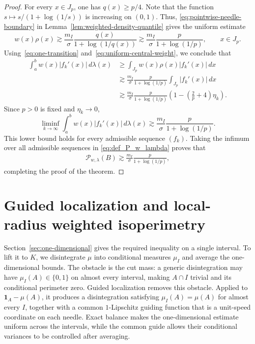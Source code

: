 \documentclass[11pt]{article}
\theoremstyle{definition}
\theoremstyle{remark}
\newcommand{\one}{\mathbf 1}
\begin{document}
\begin{proof}
For every $x\in J_p$, one has $q(x)\ge p/4$. Note that the function
$s\mapsto s/(1+\log(1/s))$ is increasing on $(0,1)$. Thus, \eqref{eq:pointwise-needle-boundary} in Lemma~\ref{lem:weighted-density-quantile} gives the uniform estimate
\begin{equation}\label{eq:uniform-central-weight}
 w(x)\rho(x)\gtrsim
 \frac{m_I}{\sigma}
 \frac{q(x)}{1+\log(1/q(x))}
 \gtrsim
 \frac{m_I}{\sigma}
 \frac{p}{1+\log(1/p)},
 \qquad x\in J_p.
\end{equation}
Using~\eqref{eq:one-transition} and~\eqref{eq:uniform-central-weight}, we conclude that
\begin{align*}
 \int_a^b w(x)|f_k'(x)|\,d\lambda(x)
 &\ge
 \int_{J_p}w(x)\rho(x)|f_k'(x)|\,dx\\
 &\gtrsim
 \frac{m_I}{\sigma}
 \frac{p}{1+\log(1/p)}
 \int_{J_p}|f_k'(x)|\,dx\\
 &\gtrsim
 \frac{m_I}{\sigma}
 \frac{p}{1+\log(1/p)}
 \left(1-\left(\frac2p+4\right)\eta_k\right).
\end{align*}
 Since $p>0$ is fixed and
$\eta_k\to0$,
\[
 \liminf_{k\to\infty}
 \int_a^b w(x)|f_k'(x)|\,d\lambda(x)
 \gtrsim
 \frac{m_I}{\sigma}
 \frac{p}{1+\log(1/p)}.
\]
This lower bound holds for every admissible sequence $(f_k)$.  Taking the infimum over all admissible sequences 
in \eqref{eq:def_P_w_lambda} proves that
\begin{align*}
    \mathcal{P}_{w,\lambda}(B)\gtrsim\frac{m_I}{\sigma}\frac{p}{1+\log(1/p)},
\end{align*}
completing the proof of the theorem.
\end{proof}

\section{Guided localization and local-radius weighted isoperimetry}
\label{sec:balanced-needles}
Section~\ref{sec:one-dimensional} gives the required inequality on a single interval. To lift it to \(K\), we disintegrate \(\mu\) into conditional measures \(\mu_I\) and average the one-dimensional bounds. The obstacle is the cut mass: a generic disintegration may have \(\mu_I(A)\in\{0,1\}\) on almost every interval, making \(A\cap I\) trivial and its conditional perimeter zero. Guided localization removes this obstacle. Applied to \(\one_A-\mu(A)\), it produces a disintegration satisfying $\mu_I(A)=\mu(A)$ for almost every \(I\), together with a common \(1\)-Lipschitz guiding function that is a unit-speed coordinate on each needle. Exact balance makes the one-dimensional estimate uniform across the intervals, while the common guide allows their conditional variances to be controlled after averaging.
\end{document}
